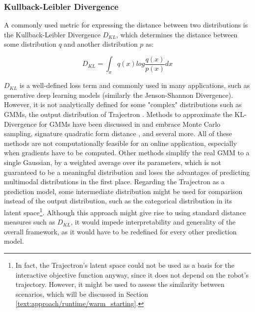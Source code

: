 \subsubsection{Kullback-Leibler Divergence}
A commonly used metric for expressing the distance between two distributions is the Kullback-Leibler Divergence $D_{KL}$, which determines the distance between  some distribution $q$ and another distribution $p$ as:

\begin{equation}
D_{KL} = \int_x q(x) log \frac{q(x)}{p(x)} dx    
\end{equation}

$D_{KL}$ is a well-defined loss term and commonly used in many applications, such as generative deep learning models \cite{Goodfellow2014}\cite{Salzmann2020} (similarly the Jenson-Shannon Divergence). However, it is not analytically defined for some "complex" distributions such as \ac{GMM}s, the output distribution of Trajectron \cite{Ivanovic2018}. Methods to approximate the KL-Divergence for \ac{GMM}s have been discussed in \cite{Cui2015} and embrace Monte Carlo sampling, signature quadratic form distance \cite{Beecks2011}, and several more. All of these methods are not computationally feasible for an online application, especially when gradients have to be computed. Other methods simplify the real \ac{GMM} to a single Gaussian, by a weighted average over its parameters, which is not guaranteed to be a meaningful distribution and loses the advantages of predicting multimodal distributions in the first place.
\newline
Regarding the Trajectron \cite{Ivanovic2018} as a prediction model, some intermediate distribution might be used for comparison instead of the output distribution, such as the categorical distribution in its latent space\footnote{In fact, the Trajectron's latent space could not be used as a basis for the interactive objective function anyway, since it does not depend on the robot's trajectory. However, it might be used to assess the similarity between scenarios, which will be discussed in Section \ref{text:approach/runtime/warm_starting}.}. Although this approach might give rise to using standard distance measures such as $D_{KL}$, it would impede interpretability and generality of the overall framework, as it would have to be redefined for every other prediction model.

